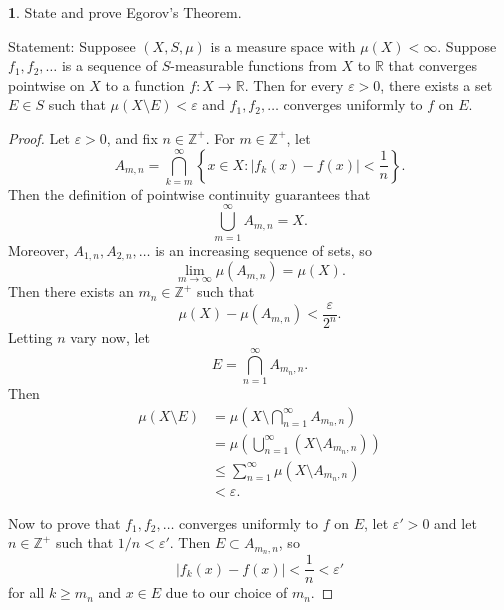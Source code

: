 \documentclass[12pt]{article}
\theoremstyle{definition}
\newtheorem{ex}{}
\newenvironment{exercise}[1]{
	\renewcommand{\theex}{#1}
	\begin{ex}
		}{\end{ex}}
\begin{document}
\begin{exercise}{1(b)}
	State and prove Egorov's Theorem.
\end{exercise}
Statement: Supposee $(X, S, \mu)$ is a measure space with $\mu(X) < \infty$.
Suppose $f_1, f_2, \dots$ is a sequence of $S$-measurable functions from $X$ to $\mathbb{R}$ that converges pointwise on $X$ to a function $f : X \to \mathbb{R}$.
Then for every $\varepsilon > 0$, there exists a set $E \in S$ such that $\mu(X \setminus E) < \varepsilon$ and $f_1, f_2, \dots$ converges uniformly to $f$ on $E$.
\begin{proof}
	Let $\varepsilon > 0$, and fix $n \in \mathbb{Z}^+$.
	For $m \in \mathbb{Z}^+$, let \begin{equation*}
		A_{m, n} = \bigcap_{k=m}^\infty \left\lbrace x \in X : |f_k(x) - f(x)| < \frac{1}{n} \right\rbrace.
	\end{equation*}
	Then the definition of pointwise continuity guarantees that \begin{equation*}
		\bigcup_{m=1}^\infty A_{m,n} = X.
	\end{equation*}
	Moreover, $A_{1, n}, A_{2, n}, \dots$ is an increasing sequence of sets, so \begin{equation*}
		\lim_{m \to \infty} \mu(A_{m,n}) = \mu(X).
	\end{equation*}
	Then there exists an $m_n \in \mathbb{Z}^+$ such that \begin{equation*}
		\mu(X) - \mu(A_{m,n}) < \frac{\varepsilon}{2^n}.
	\end{equation*}
	Letting $n$ vary now, let \begin{equation*}
		E = \bigcap_{n = 1}^\infty A_{m_n, n}.
	\end{equation*}
	Then \begin{align*}
		\mu(X \setminus E) & = \mu \left( X \setminus \bigcap_{n=1}^\infty A_{m_n, n} \right)   \\
		                   & = \mu \left( \bigcup_{n=1}^\infty (X \setminus A_{m_n, n}) \right) \\
		                   & \leq \sum_{n=1}^\infty \mu(X \setminus A_{m_n, n})                 \\
		                   & < \varepsilon.
	\end{align*}

	Now to prove that $f_1, f_2, \dots$ converges uniformly to $f$ on $E$, let $\varepsilon' > 0$ and let $n \in \mathbb{Z}^+$ such that $1/n < \varepsilon'$.
	Then $E \subset A_{m_n, n}$, so \begin{equation*}
		|f_k(x) - f(x)| < \frac{1}{n} < \varepsilon'
	\end{equation*}
	for all $k \geq m_n$ and $x \in E$ due to our choice of $m_n$.
\end{proof}
\end{document}
